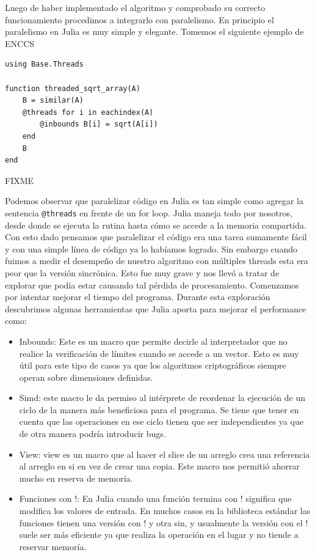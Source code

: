 \documentclass[11pt]{article}
\begin{document}
Luego de haber implementado el algoritmo y comprobado su correcto funcionamiento procedimos a integrarlo con paralelismo. En principio el paralelismo en Julia es muy simple y elegante. Tomemos el siguiente ejemplo de ENCCS \cite{jl:ex:encss_jl_threading}

\begin{listing}[H]
\begin{verbatim}
using Base.Threads

function threaded_sqrt_array(A)
    B = similar(A)
    @threads for i in eachindex(A)
        @inbounds B[i] = sqrt(A[i])
    end
    B
end
\end{verbatim}
\caption{FIXME}
\end{listing}

Podemos observar que paralelizar código en Julia es tan simple como agregar la sentencia \texttt{@threads} en frente de un for loop. Julia maneja todo por nosotros, desde donde se ejecuta la rutina hasta cómo se accede a la memoria compartida. Con esto dado pensamos que paralelizar el código era una tarea sumamente fácil y con una simple línea de código ya lo habíamos logrado. Sin embargo cuando fuimos a medir el desempeño de nuestro algoritmo con múltiples threads esta era peor que la versión sincrónica. Esto fue muy grave y nos llevó a tratar de explorar que podía estar causando tal pérdida de procesamiento. Comenzamos por intentar mejorar el tiempo del programa. Durante esta exploración descubrimos algunas herramientas que Julia aporta para mejorar el performance como:

\begin{itemize}
    \item Inbounds: Este es un macro que permite decirle al interpretador que no realice la verificación de límites cuando se accede a un vector. Esto es muy útil para este tipo de casos ya que los algoritmos criptográficos siempre operan sobre dimensiones definidas.
    \item Simd: este macro le da permiso al intérprete de reordenar la ejecución de un ciclo de la manera más beneficiosa para el programa. Se tiene que tener en cuenta que las operaciones en ese ciclo tienen que ser independientes ya que de otra manera podría introducir bugs.
    \item View: view es un macro que al hacer el slice de un arreglo crea una referencia al arreglo en si en vez de crear una copia. Este macro nos permitió ahorrar mucho en reserva de memoría.
    \item Funciones con !: En Julia cuando una función termina con ! significa que modifica los valores de entrada. En muchos casos en la biblioteca estándar las funciones tienen una versión con ! y otra sin, y usualmente la versión con el ! suele ser más eficiente ya que realiza la operación en el lugar y no tiende a reservar memoría.
\end{itemize}
\end{document}
